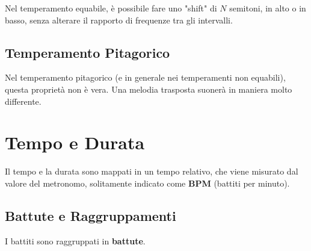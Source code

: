 Nel temperamento equabile, è possibile fare uno "shift" di \( N \) semitoni, in alto o in basso, senza alterare il rapporto di frequenze tra gli intervalli.

\subsection*{Temperamento Pitagorico}

Nel temperamento pitagorico (e in generale nei temperamenti non equabili), questa proprietà non è vera. Una melodia trasposta suonerà in maniera molto differente.

\section{Tempo e Durata}

Il tempo e la durata sono mappati in un tempo relativo, che viene misurato dal valore del metronomo, solitamente indicato come \textbf{BPM} (battiti per minuto).

\subsection*{Battute e Raggruppamenti}

I battiti sono raggruppati in \textbf{battute}.


